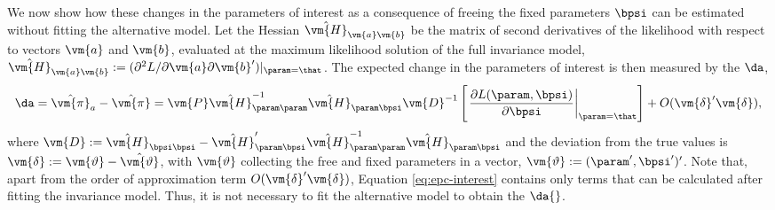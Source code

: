 We now show how these changes in the parameters of interest as a consequence of freeing the fixed parameters $\bpsi$ can be estimated without fitting the alternative model. Let the Hessian $\hat{\vm{H}}_{\vm{a}\vm{b}}$ be the matrix of second derivatives of the likelihood with respect to vectors $\vm{a}$ and $\vm{b}$, evaluated at the maximum likelihood solution of the full invariance model, $\hat{\vm{H}}_{\vm{a}\vm{b}} := (\partial^2 L /\partial \vm{a} \partial \vm{b}^\prime)|_{\param=\that}$. 
The expected change in the parameters of interest is then measured by the $\da$, 
\begin{equation}
\da = \hat{\vm{\pi}}_a - \hat{\vm{\pi}} = \vm{P}
\hat{\vm{H}}^{-1}_{\param\param} \hat{\vm{H}}_{\param\bpsi}\vm{D}^{-1}
		\left[ \left.\frac{\partial L(\param, \bpsi)}{\partial \bpsi}\right|_{\param = \that} \right] +	
		O(\vm{\delta}^\prime\vm{\delta}),
		\label{eq:epc-interest}
\end{equation}
where $\vm{D}:= \hat{\vm{H}}_{\bpsi\bpsi} - \hat{\vm{H}}_{\param\bpsi}^\prime \hat{\vm{H}}^{-1}_{\param\param} \hat{\vm{H}}_{\param\bpsi}$ and the deviation from the true values is $\vm{\delta}:= \vm{\vartheta} - \hat{\vm{\vartheta}}$, with $\vm{\vartheta}$ collecting the free and fixed parameters in a vector, $\vm{\vartheta}:= (\param^\prime, \bpsi^\prime)^\prime$. Note that, apart from the order of approximation term $O(\vm{\delta}^\prime \vm{\delta})$,  Equation \ref{eq:epc-interest} contains only terms that can be calculated after fitting the invariance model.
 Thus, it is not necessary to fit the alternative model to obtain the $\da{}$.


